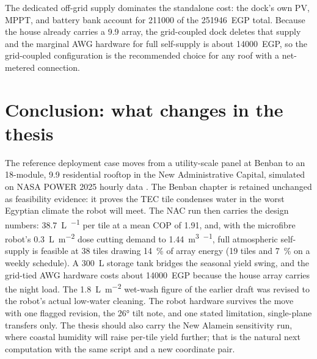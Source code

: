 \documentclass[11pt,a4paper]{article}
\begin{document}
The dedicated off-grid supply dominates the standalone cost: the dock's own
PV, MPPT, and battery bank account for \num{211000} of the
\num{251946}~EGP total. Because the house already carries a
\SI{9.9}{\kWp} array, the grid-coupled dock deletes that supply and the
marginal AWG hardware for full self-supply is about \num{14000}~EGP, so the
grid-coupled configuration is the recommended choice for any roof with a
net-metered connection.

\section{Conclusion: what changes in the thesis}

The reference deployment case moves from a utility-scale panel at Benban
to an 18-module, \SI{9.9}{\kWp} residential rooftop in the New
Administrative Capital, simulated on NASA POWER 2025 hourly data
\cite{nasa_power_nac2025}. The Benban chapter is retained unchanged as
feasibility evidence: it proves the TEC tile condenses water in the
worst Egyptian climate the robot will meet. The NAC run then carries the
design numbers: \SI{38.7}{\liter\per\yr} per tile at a mean COP of
\num{1.91}, and, with the microfibre robot's \SI{0.3}{\liter\per\metre\squared}
dose cutting demand to \SI{1.44}{\cubic\metre\per\yr}, full atmospheric
self-supply is feasible at 38 tiles drawing \SI{14}{\percent} of array
energy (19 tiles and \SI{7}{\percent} on a weekly schedule). A
\SI{300}{\liter} storage tank bridges the seasonal yield swing, and the
grid-tied AWG hardware costs about \num{14000}~EGP because the house array
carries the night load. The \SI{1.8}{\liter\per\metre\squared} wet-wash
figure of the earlier draft was revised to the robot's actual low-water
cleaning. The robot hardware survives the move with one flagged revision,
the \ang{26} tilt note, and one stated limitation, single-plane transfers
only. The thesis should also carry the New Alamein sensitivity run, where
coastal humidity will raise per-tile yield further; that is the natural
next computation with the same script and a new coordinate pair.



\end{document}
